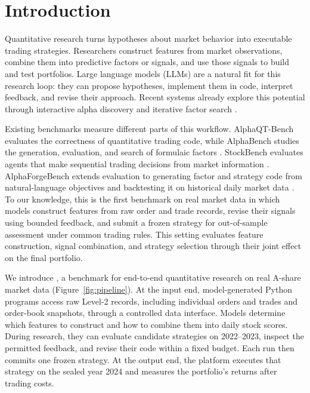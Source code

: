 \section{Introduction}
\label{sec:intro}

Quantitative research turns hypotheses about market behavior into executable trading strategies. Researchers construct features from market observations, combine them into predictive factors or signals, and use those signals to build and test portfolios. Large language models (LLMs) are a natural fit for this research loop: they can propose hypotheses, implement them in code, interpret feedback, and revise their approach. Recent systems already explore this potential through interactive alpha discovery and iterative factor search \citep{Wang2023AlphaGPT,Tang2025AlphaAgent,Han2026QuantaAlpha}.

Existing benchmarks measure different parts of this workflow. AlphaQT-Bench evaluates the correctness of quantitative trading code, while AlphaBench studies the generation, evaluation, and search of formulaic factors \citep{AlphaQTBench2026,Luo2026AlphaBench}. StockBench evaluates agents that make sequential trading decisions from market information \citep{StockBench2025}. AlphaForgeBench extends evaluation to generating factor and strategy code from natural-language objectives and backtesting it on historical daily market data \citep{Zhang2026AlphaForgeBench}.
To our knowledge, this is the first benchmark on real market data in which models construct features from raw order and trade records, revise their signals using bounded feedback, and submit a frozen strategy for out-of-sample assessment under common trading rules. This setting evaluates feature construction, signal combination, and strategy selection through their joint effect on the final portfolio.

We introduce \textbf{\BenchmarkName}, a benchmark for end-to-end quantitative research on real A-share market data (Figure~\ref{fig:pipeline}). At the input end, model-generated Python programs access raw Level-2 records, including individual orders and trades and order-book snapshots, through a controlled data interface. Models determine which features to construct and how to combine them into daily stock scores. During research, they can evaluate candidate strategies on 2022--2023, inspect the permitted feedback, and revise their code within a fixed budget. Each run then commits one frozen strategy. At the output end, the platform executes that strategy on the sealed year 2024 and measures the portfolio's returns after trading costs.


